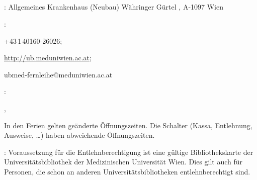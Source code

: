 






\subsection{}

{%
\begin{compactitem}
  \item {}: Allgemeines Krankenhaus (Neubau)
  Währinger Gürtel , A-1097 Wien
  \item {}:
  \begin{inparadesc}
    \item[Tel.] +43\,1\,40160-26026;
    \item[WWW] \url{http://ub.meduniwien.ac.at};
    \item[E-Mail für Fernleihebestellungen] ubmed-fernleihe@meduniwien.ac.at
  \end{inparadesc}
  \item {}:
  \begin{inparadesc}
    \item[\VonBis{Mo}{Fr}] ,
    \item[Sa] 
    \item[Sonst.:] In den Ferien gelten geänderte
    Öffnungszeiten. Die Schalter (Kassa, Entlehnung,
    Ausweise, \ldots) haben abweichende Öffnungszeiten.
  \end{inparadesc}
  \item {}: Voraussetzung für die
  Entlehnberechtigung ist eine gültige Bibliothekskarte der
  Universitätsbibliothek der Medizinischen Universität Wien.
  Dies gilt auch für Personen, die schon an anderen
  Universitätsbibliotheken entlehnberechtigt sind.
\end{compactitem}
}{}{}{}{}















